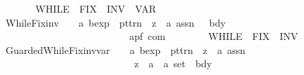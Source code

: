 \begin{isabellebody}
\ \ \ \ \ \ \ \ {\isacharparenleft}{\isachardoublequoteopen}{\isacharparenleft}{}WHILE\ {\isacharparenleft}{\isacharunderscore}{\isacharparenright}{\isacharslash}\ FIX\ {\isacharunderscore}{\isachardot}{\isacharslash}\ INV\ {\isacharparenleft}{\isacharunderscore}{\isacharparenright}{\isacharslash}\ VAR\ {\isacharparenleft}{\isacharunderscore}{\isacharparenright}\ {\isacharslash}{\isacharunderscore}{\isacharparenright}{\isachardoublequoteclose}\ \ {\isacharbrackleft}{}{}{\isacharcomma}\ {}{\isacharcomma}\ {}{\isacharcomma}\ {}{\isacharcomma}\ {}{}{\isacharbrackright}\ {}{}{\isacharparenright}\isanewline
\ \ {\isachardoublequoteopen}{\isacharunderscore}WhileFix{\isacharunderscore}inv{\isachardoublequoteclose}\ \ \ {\isacharcolon}{\isacharcolon}\ {\isachardoublequoteopen}{\isacharprime}a\ bexp\ {\isacharequal}{\isachargreater}\ pttrn\ {\isasymRightarrow}\ {\isacharparenleft}{\isacharprime}z\ {\isasymRightarrow}\ {\isacharprime}a\ assn{\isacharparenright}\ \ {\isasymRightarrow}\ bdy\ \isanewline
\ \ \ \ \ \ \ \ \ \ \ \ \ \ \ \ \ \ \ \ \ \ \ \ \ \ {\isasymRightarrow}\ {\isacharparenleft}{\isacharprime}a{\isacharcomma}{\isacharprime}p{\isacharcomma}{\isacharprime}f{\isacharparenright}\ com{\isachardoublequoteclose}\isanewline
\ \ \ \ \ \ \ \ {\isacharparenleft}{\isachardoublequoteopen}{\isacharparenleft}{}WHILE\ {\isacharparenleft}{\isacharunderscore}{\isacharparenright}{\isacharslash}\ FIX\ {\isacharunderscore}{\isachardot}{\isacharslash}\ INV\ {\isacharparenleft}{\isacharunderscore}{\isacharparenright}\ {\isacharslash}{\isacharunderscore}{\isacharparenright}{\isachardoublequoteclose}\ \ {\isacharbrackleft}{}{}{\isacharcomma}\ {}{\isacharcomma}\ {}{\isacharcomma}\ {}{}{\isacharbrackright}\ {}{}{\isacharparenright}\isanewline
\ \ {\isachardoublequoteopen}{\isacharunderscore}GuardedWhileFix{\isacharunderscore}inv{\isacharunderscore}var{\isachardoublequoteclose}\ \ \ {\isacharcolon}{\isacharcolon}\ {\isachardoublequoteopen}{\isacharprime}a\ bexp\ {\isacharequal}{\isachargreater}\ pttrn\ {\isasymRightarrow}\ {\isacharparenleft}{\isacharprime}z\ {\isasymRightarrow}\ {\isacharprime}a\ assn{\isacharparenright}\ \ {\isasymRightarrow}\ \isanewline
\ \ \ \ \ \ \ \ \ \ \ \ \ \ \ \ \ \ \ \ \ \ \ \ \ \ \ \ {\isacharparenleft}{\isacharprime}z\ {\isasymRightarrow}\ {\isacharparenleft}{\isacharprime}a\ {\isasymtimes}\ {\isacharprime}a{\isacharparenright}\ set{\isacharparenright}\ {\isasymRightarrow}\ bdy\ \isanewline

\end{isabellebody}
